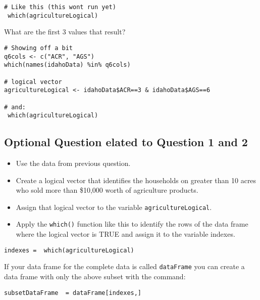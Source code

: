 \documentclass[]{article}
\begin{document}
\begin{framed} 
\begin{verbatim}
# Like this (this wont run yet)
 which(agricultureLogical) 
\end{verbatim}
\end{framed} 

What are the first 3 values that result?

\begin{framed} \begin{verbatim}
# Showing off a bit
q6cols <- c("ACR", "AGS")
which(names(idahoData) %in% q6cols)  

# logical vector
agricultureLogical <- idahoData$ACR==3 & idahoData$AGS==6

# and:
 which(agricultureLogical) 
\end{verbatim}\end{framed} 


\newpage
\subsection*{Optional Question elated to Question 1 and 2}

\begin{itemize}
\item Use the data from previous question. 
\item Create a logical vector that identifies the households on greater than 10 acres who
 sold more than \$10,000 worth of agriculture products. 
\item Assign that logical vector to the variable \texttt{agricultureLogical}. 
\item Apply the \texttt{which()} function like this to identify the rows of the 
data frame where the logical vector is TRUE and assign it to the variable indexes. 
\end{itemize}

\begin{framed} \begin{verbatim}
indexes =  which(agricultureLogical) 
\end{verbatim}\end{framed} 

If your data frame for the complete data is called \texttt{dataFrame} you can create a data frame 
with only the above subset with the command: 

\begin{framed} 
\begin{verbatim}
subsetDataFrame  = dataFrame[indexes,] 
\end{verbatim}
\end{framed} 
\end{document}
